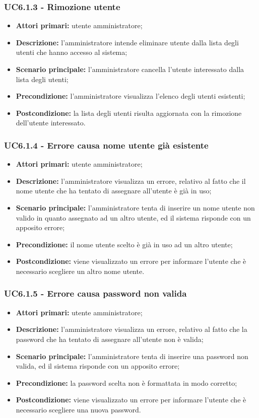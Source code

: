 \subsubsection{UC6.1.3 - Rimozione utente}
\begin{itemize}
	\item \textbf{Attori primari:} utente amministratore;
	\item \textbf{Descrizione:} l'amministratore intende eliminare utente dalla lista degli utenti che hanno accesso al sistema;
	\item \textbf{Scenario principale:} l'amministratore cancella l'utente interessato dalla lista degli utenti;
	\item \textbf{Precondizione:} l'amministratore visualizza l'elenco degli utenti esistenti;
	\item \textbf{Postcondizione:} la lista degli utenti risulta aggiornata con la rimozione dell'utente interessato.
\end{itemize}

\subsubsection{UC6.1.4 - Errore causa nome utente già esistente}
\begin{itemize}
	\item \textbf{Attori primari:} utente amministratore;
	\item \textbf{Descrizione:} l'amministratore visualizza un errore, relativo al fatto che il nome utente che ha tentato di assegnare all'utente è già in uso;
	\item \textbf{Scenario principale:} l'amministratore tenta di inserire un nome utente non valido in quanto assegnato ad un altro utente, ed il sistema risponde con un apposito errore;
	\item \textbf{Precondizione:} il nome utente scelto è già in uso ad un altro utente;
	\item \textbf{Postcondizione:} viene visualizzato un errore per informare l'utente che è necessario scegliere un altro nome utente.
\end{itemize}

\subsubsection{UC6.1.5 - Errore causa password non valida}
\begin{itemize}
	\item \textbf{Attori primari:} utente amministratore;
	\item \textbf{Descrizione:} l'amministratore visualizza un errore, relativo al fatto che la password che ha tentato di assegnare all'utente non è valida;
	\item \textbf{Scenario principale:} l'amministratore tenta di inserire una password non valida, ed il sistema risponde con un apposito errore;
	\item \textbf{Precondizione:} la password scelta non è formattata in modo corretto;
	\item \textbf{Postcondizione:} viene visualizzato un errore per informare l'utente che è necessario scegliere una nuova password.
\end{itemize}

